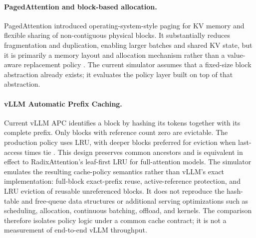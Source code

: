 \documentclass[11pt]{article}
\begin{document}
\paragraph{PagedAttention and block-based allocation.}
PagedAttention introduced operating-system-style paging for KV memory and flexible
sharing of non-contiguous physical blocks.  It substantially reduces fragmentation and
duplication, enabling larger batches and shared KV state, but it is primarily a memory
layout and allocation mechanism rather than a value-aware replacement policy
\cite{pagedattention}.  The current simulator assumes that a fixed-size block abstraction
already exists; it evaluates the policy layer built on top of that abstraction.

\paragraph{vLLM Automatic Prefix Caching.}
Current vLLM APC identifies a block by hashing its tokens together with its complete
prefix.  Only blocks with reference count zero are evictable.  The production policy
uses LRU, with deeper blocks preferred for eviction when last-access times tie
\cite{vllm-apc}.  This design preserves common ancestors and is equivalent in effect to
RadixAttention's leaf-first LRU for full-attention models.
The simulator emulates the resulting cache-policy semantics rather than vLLM's exact
implementation: full-block exact-prefix reuse, active-reference protection, and LRU
eviction of reusable unreferenced blocks.  It does not reproduce the hash-table and
free-queue data structures or additional serving optimizations such as scheduling,
allocation, continuous batching, offload, and kernels.  The comparison therefore
isolates policy logic under a common cache contract; it is not a measurement of
end-to-end vLLM throughput.
\end{document}
